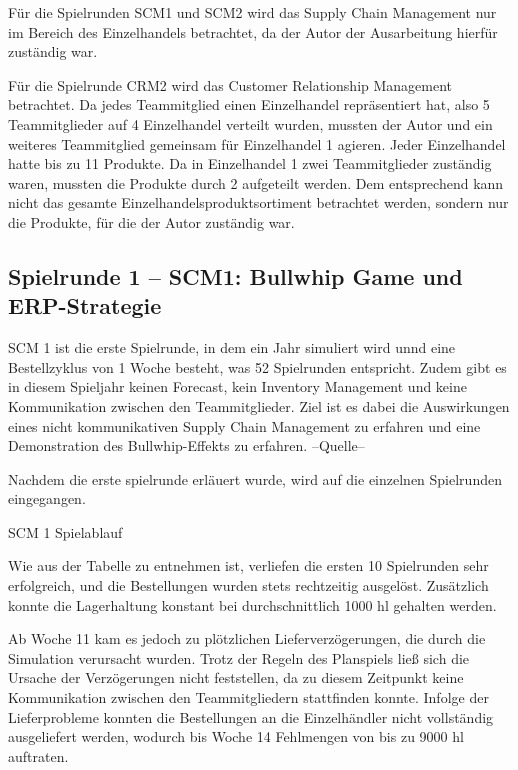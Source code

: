 \documentclass[a4paper,12pt]{article}
\begin{document}
Für die Spielrunden SCM1 und SCM2 wird das Supply Chain Management nur im Bereich des Einzelhandels betrachtet,
da der Autor der Ausarbeitung hierfür zuständig war.

Für die Spielrunde CRM2 wird das Customer Relationship Management betrachtet. Da jedes Teammitglied einen Einzelhandel repräsentiert hat, also 5 Teammitglieder auf 4 Einzelhandel verteilt wurden,
mussten der Autor und ein weiteres Teammitglied gemeinsam für Einzelhandel 1 agieren. Jeder Einzelhandel hatte bis zu 11 Produkte. Da in Einzelhandel 1 zwei Teammitglieder zuständig waren, mussten die Produkte durch 2 aufgeteilt werden.
Dem entsprechend kann nicht das gesamte Einzelhandelsproduktsortiment betrachtet werden, sondern nur die Produkte, für die der Autor zuständig war.

\subsection{Spielrunde 1 – SCM1: Bullwhip Game und ERP-Strategie}
SCM 1 ist die erste Spielrunde, in dem ein Jahr simuliert wird unnd eine Bestellzyklus von 1 Woche besteht, was 52 Spielrunden entspricht.
Zudem gibt es in diesem Spieljahr keinen Forecast, kein Inventory Management und keine Kommunikation zwischen den Teammitglieder.
Ziel ist es dabei die Auswirkungen eines nicht kommunikativen Supply Chain Management zu erfahren und eine Demonstration des Bullwhip-Effekts zu erfahren.
--Quelle--

Nachdem die  erste spielrunde erläuert wurde, wird auf die einzelnen Spielrunden eingegangen.
\begin{table}[H]
    \centering
    \caption{SCM 1 Spielablauf}
    \label{tab:SCM 1 Spielablauf}
\end{table}

Wie aus der Tabelle zu entnehmen ist, verliefen die ersten 10 Spielrunden sehr erfolgreich, und die Bestellungen wurden stets rechtzeitig ausgelöst.
Zusätzlich konnte die Lagerhaltung konstant bei durchschnittlich 1000 hl gehalten werden.

Ab Woche 11 kam es jedoch zu plötzlichen Lieferverzögerungen, die durch die Simulation verursacht wurden.
Trotz der Regeln des Planspiels ließ sich die Ursache der Verzögerungen nicht feststellen, da zu diesem Zeitpunkt keine Kommunikation zwischen den Teammitgliedern stattfinden konnte.
Infolge der Lieferprobleme konnten die Bestellungen an die Einzelhändler nicht vollständig ausgeliefert werden, wodurch bis Woche 14 Fehlmengen von bis zu 9000 hl auftraten.
\end{document}
